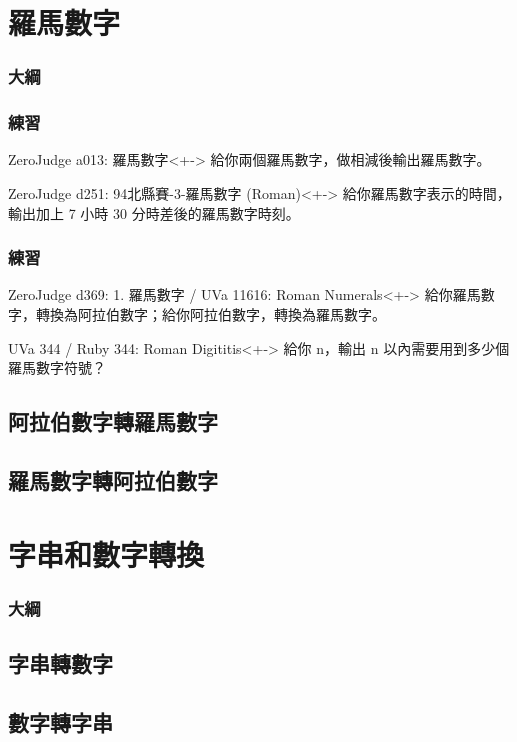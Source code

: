 \documentclass[utf8]{beamer}
\begin{document}
\begin{CJK}{UTF8}{bkai}
\section{羅馬數字}
\begin{frame}
  \frametitle{大綱}
  \begin{multicols}{2}
    \tableofcontents[currentsection]
  \end{multicols}
\end{frame}

\begin{frame}[fragile]
  \frametitle{練習}
  \begin{exampleblock}{ZeroJudge a013: 羅馬數字}<+->
  給你兩個羅馬數字，做相減後輸出羅馬數字。
  \end{exampleblock}
  \begin{exampleblock}{ZeroJudge d251: 94北縣賽-3-羅馬數字 (Roman)}<+->
  給你羅馬數字表示的時間，輸出加上 7 小時 30 分時差後的羅馬數字時刻。
  \end{exampleblock}
\end{frame}

\begin{frame}[fragile]
  \frametitle{練習}
  \begin{exampleblock}{ZeroJudge d369: 1. 羅馬數字 / UVa 11616: Roman Numerals}<+->
  給你羅馬數字，轉換為阿拉伯數字；給你阿拉伯數字，轉換為羅馬數字。
  \end{exampleblock}
  \begin{exampleblock}{UVa 344 / Ruby 344: Roman Digititis}<+->
  給你 n，輸出 n 以內需要用到多少個羅馬數字符號？
  \end{exampleblock}
\end{frame}

\subsection{阿拉伯數字轉羅馬數字}

\subsection{羅馬數字轉阿拉伯數字}

\section{字串和數字轉換}
\begin{frame}
  \frametitle{大綱}
  \begin{multicols}{2}
    \tableofcontents[currentsection]
  \end{multicols}
\end{frame}

\subsection{字串轉數字}

\subsection{數字轉字串}

\clearpage
\end{CJK}
\end{document}
